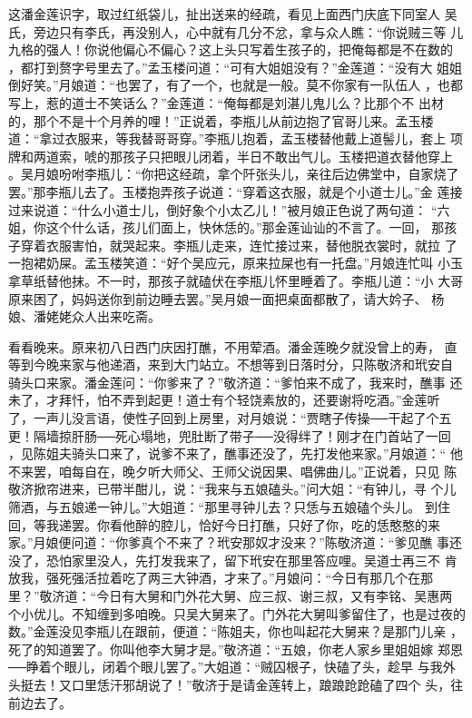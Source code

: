 这潘金莲识字，取过红纸袋儿，扯出送来的经疏，看见上面西门庆底下同室人
吴氏，旁边只有李氏，再没别人，心中就有几分不忿，拿与众人瞧：“你说贼三等
儿九格的强人！你说他偏心不偏心？这上头只写着生孩子的，把俺每都是不在数的
，都打到赘字号里去了。”孟玉楼问道：“可有大姐姐没有？”金莲道：“没有大
姐姐倒好笑。”月娘道：“也罢了，有了一个，也就是一般。莫不你家有一队伍人
，也都写上，惹的道士不笑话么？”金莲道：“俺每都是刘湛儿鬼儿么？比那个不
出材的，那个不是十个月养的哩！”正说着，李瓶儿从前边抱了官哥儿来。孟玉楼
道：“拿过衣服来，等我替哥哥穿。”李瓶儿抱着，孟玉楼替他戴上道髻儿，套上
项牌和两道索，唬的那孩子只把眼儿闭着，半日不敢出气儿。玉楼把道衣替他穿上
。吴月娘吩咐李瓶儿：“你把这经疏，拿个阡张头儿，亲往后边佛堂中，自家烧了
罢。”那李瓶儿去了。玉楼抱弄孩子说道：“穿着这衣服，就是个小道士儿。”金
莲接过来说道：“什么小道士儿，倒好象个小太乙儿！”被月娘正色说了两句道：
“六姐，你这个什么话，孩儿们面上，快休恁的。”那金莲讪讪的不言了。一回，
那孩子穿着衣服害怕，就哭起来。李瓶儿走来，连忙接过来，替他脱衣裳时，就拉
了一抱裙奶屎。孟玉楼笑道：“好个吴应元，原来拉屎也有一托盘。”月娘连忙叫
小玉拿草纸替他抹。不一时，那孩子就磕伏在李瓶儿怀里睡着了。李瓶儿道：“小
大哥原来困了，妈妈送你到前边睡去罢。”吴月娘一面把桌面都散了，请大妗子、
杨娘、潘姥姥众人出来吃斋。

看看晚来。原来初八日西门庆因打醮，不用荤酒。潘金莲晚夕就没曾上的寿，
直等到今晚来家与他递酒，来到大门站立。不想等到日落时分，只陈敬济和玳安自
骑头口来家。潘金莲问：“你爹来了？”敬济道：“爹怕来不成了，我来时，醮事
还未了，才拜忏，怕不弄到起更！道士有个轻饶素放的，还要谢将吃酒。”金莲听
了，一声儿没言语，使性子回到上房里，对月娘说：“贾瞎子传操──干起了个五
更！隔墙掠肝肠──死心塌地，兜肚断了带子──没得绊了！刚才在门首站了一回
，见陈姐夫骑头口来了，说爹不来了，醮事还没了，先打发他来家。”月娘道：“
他不来罢，咱每自在，晚夕听大师父、王师父说因果、唱佛曲儿。”正说着，只见
陈敬济掀帘进来，已带半酣儿，说：“我来与五娘磕头。”问大姐：“有钟儿，寻
个儿筛酒，与五娘递一钟儿。”大姐道：“那里寻钟儿去？只恁与五娘磕个头儿。
到住回，等我递罢。你看他醉的腔儿，恰好今日打醮，只好了你，吃的恁憨憨的来
家。”月娘便问道：“你爹真个不来了？玳安那奴才没来？”陈敬济道：“爹见醮
事还没了，恐怕家里没人，先打发我来了，留下玳安在那里答应哩。吴道士再三不
肯放我，强死强活拉着吃了两三大钟酒，才来了。”月娘问：“今日有那几个在那
里？”敬济道：“今日有大舅和门外花大舅、应三叔、谢三叔，又有李铭、吴惠两
个小优儿。不知缠到多咱晚。只吴大舅来了。门外花大舅叫爹留住了，也是过夜的
数。”金莲没见李瓶儿在跟前，便道：“陈姐夫，你也叫起花大舅来？是那门儿亲
，死了的知道罢了。你叫他李大舅才是。”敬济道：“五娘，你老人家乡里姐姐嫁
郑恩──睁着个眼儿，闭着个眼儿罢了。”大姐道：“贼囚根子，快磕了头，趁早
与我外头挺去！又口里恁汗邪胡说了！”敬济于是请金莲转上，踉踉跄跄磕了四个
头，往前边去了。

